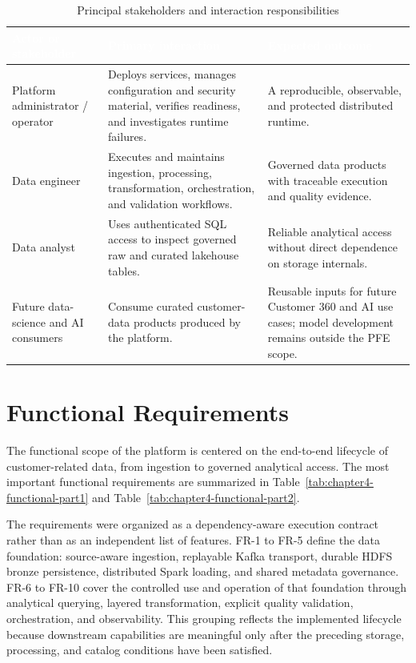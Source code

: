 \begin{table}[!htbp]
    \centering
    \footnotesize
    \renewcommand{\arraystretch}{1.16}
    \begin{tabularx}{\textwidth}{|L{3.0cm}|Y|Y|}
        \hline
        \textcolor{white}{\textbf{Actor or stakeholder}} & \textcolor{white}{\textbf{Primary interaction}} & \textcolor{white}{\textbf{Expected outcome}} \\
        \hline
        Platform administrator / operator & Deploys services, manages configuration and security material, verifies readiness, and investigates runtime failures. & A reproducible, observable, and protected distributed runtime. \\
        \hline
        Data engineer & Executes and maintains ingestion, processing, transformation, orchestration, and validation workflows. & Governed data products with traceable execution and quality evidence. \\
        \hline
        Data analyst & Uses authenticated SQL access to inspect governed raw and curated lakehouse tables. & Reliable analytical access without direct dependence on storage internals. \\
        \hline
        Future data-science and AI consumers & Consume curated customer-data products produced by the platform. & Reusable inputs for future Customer 360 and AI use cases; model development remains outside the PFE scope. \\
        \hline
    \end{tabularx}
    \caption{Principal stakeholders and interaction responsibilities}
    \label{tab:chapter4-actors}
\end{table}
\FloatBarrier

\section{Functional Requirements}
The functional scope of the platform is centered on the end-to-end lifecycle of customer-related data, from ingestion to governed analytical access. The most important functional requirements are summarized in Table~\ref{tab:chapter4-functional-part1} and Table~\ref{tab:chapter4-functional-part2}.

The requirements were organized as a dependency-aware execution contract rather than as an independent list of features. FR-1 to FR-5 define the data foundation: source-aware ingestion, replayable Kafka transport, durable HDFS bronze persistence, distributed Spark loading, and shared metadata governance. FR-6 to FR-10 cover the controlled use and operation of that foundation through analytical querying, layered transformation, explicit quality validation, orchestration, and observability. This grouping reflects the implemented lifecycle because downstream capabilities are meaningful only after the preceding storage, processing, and catalog conditions have been satisfied.

